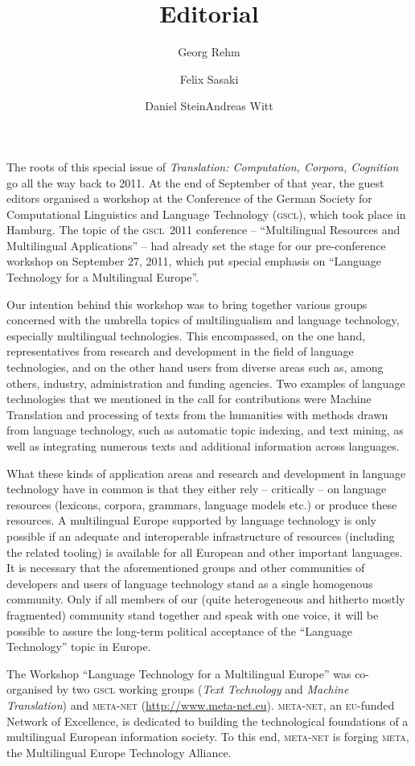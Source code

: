 \documentclass[output=paper]{LSP/langsci}
\title{Editorial}
\author{Georg Rehm\and Felix Sasaki\and Daniel Stein\lastand Andreas Witt}
\begin{document}
\noindent{}The roots of this special issue of \emph{Translation: Computation,
  Corpora, Cognition}  
  go all the way back to 2011. At the end of
September of that year, the guest editors organised a workshop at the
Conference of the German Society for Computational Linguistics and
Language Technology (\textsc{gscl}), which took place in Hamburg. The topic of
the \textsc{gscl}~2011 conference -- ``Multilingual Resources and Multilingual
Applications'' -- had already set the stage for our pre-conference
workshop on September 27, 2011, which put special emphasis on
``Language Technology for a Multilingual Europe''.

Our intention behind this workshop was to bring together various groups
concerned with the umbrella topics of multilingualism and language
technology, especially multilingual technologies. This encompassed, on
the one hand, representatives from research and development in the
field of language technologies, and on the other hand users from
diverse areas such as, among others, industry, administration and
funding agencies. Two examples of language technologies that we
mentioned in the call for contributions were Machine Translation and
processing of texts from the humanities with methods drawn from language
technology, such as automatic topic indexing, and text mining, as well
as integrating numerous texts and additional information across
languages.

What these kinds of application areas and research and development in
language technology have in common is that they either rely --
critically -- on language resources (lexicons, corpora, grammars,
language models etc.) or produce these resources. A multilingual
Europe supported by language technology is only possible if an
adequate and interoperable infrastructure of resources (including the
related tooling) is available for all European and other important
languages. It is necessary that the aforementioned groups and other
communities of developers and users of language technology stand as a
single homogenous community. Only if all members of our (quite
heterogeneous and hitherto mostly fragmented) community stand together
and speak with one voice, it will be possible to assure the long-term
political acceptance of the ``Language Technology'' topic in Europe.

The Workshop ``Language Technology for a Multilingual Europe'' was
co-or\-ga\-nised by two \textsc{gscl} working groups (\emph{Text Technology} and
\emph{Machine Translation}) and \textsc{meta-net}
(\url{http://www.meta-net.eu}). \textsc{meta-net}, an \textsc{eu}-funded Network of Excellence,
is dedicated to building the technological foundations of a multilingual
European information society. To this end, \textsc{meta-net} is forging \textsc{meta}, the
Multilingual Europe Technology Alliance.
\end{document}
